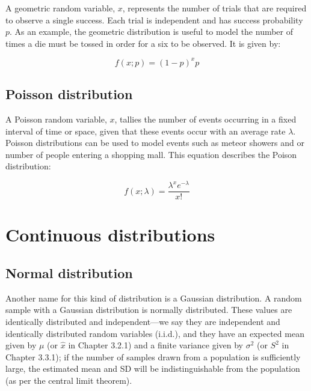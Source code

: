 \documentclass[english,10pt,a4paper,oneside]{book}
\theoremstyle{definition}
\theoremstyle{definition}
\theoremstyle{definition}
\theoremstyle{remark}
\begin{document}
A geometric random variable, \(x\), represents the number of trials that
are required to observe a single success. Each trial is independent and
has success probability \(p\). As an example, the geometric distribution
is useful to model the number of times a die must be tossed in order for
a six to be observed. It is given by:

\[f(x;p)=(1-p)^{x}p\]

\subsection{Poisson distribution}\label{poisson-distribution}

A Poisson random variable, \(x\), tallies the number of events occurring
in a fixed interval of time or space, given that these events occur with
an average rate \(\lambda\). Poisson distributions can be used to model
events such as meteor showers and or number of people entering a
shopping mall. This equation describes the Poison distribution:

\[f(x;\lambda)=\frac{\lambda^{x}e^{-\lambda}}{x!}\]

\section{Continuous distributions}\label{continuous-distributions}

\subsection{Normal distribution}\label{normal-distribution}

Another name for this kind of distribution is a Gaussian distribution. A
random sample with a Gaussian distribution is normally distributed.
These values are identically distributed and independent---we say they
are independent and identically distributed random variables (i.i.d.),
and they have an expected mean given by \(\mu\) (or \(\hat{x}\) in
Chapter 3.2.1) and a finite variance given by \(\sigma^{2}\) (or
\(S^{2}\) in Chapter 3.3.1); if the number of samples drawn from a
population is sufficiently large, the estimated mean and SD will be
indistinguishable from the population (as per the central limit
theorem).
\end{document}
